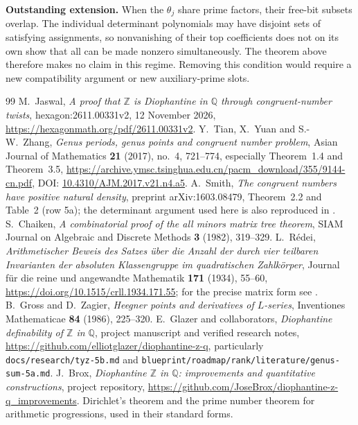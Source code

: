 \documentclass[11pt,a4paper]{article}
\theoremstyle{definition}
\newcommand{\QQ}{\mathbb Q}
\newcommand{\ZZ}{\mathbb Z}
\begin{document}
\textbf{Outstanding extension.}  When the $\theta_j$
share prime factors, their free-bit subsets overlap.
The individual determinant polynomials may have disjoint
sets of satisfying assignments, so nonvanishing of their
top coefficients does not on its own show that all can
be made nonzero simultaneously.  The theorem above
therefore makes no claim in this regime.  Removing this
condition would require a new compatibility argument or
new auxiliary-prime slots.

\begin{thebibliography}{99}
M.~Jaswal, \emph{A proof that $\ZZ$ is Diophantine in $\QQ$
through congruent-number twists}, hexagon:2611.00331v2,
12 November 2026,
\url{https://hexagonmath.org/pdf/2611.00331v2}.
Y.~Tian, X.~Yuan and S.-W.~Zhang,
\emph{Genus periods, genus points and congruent number problem},
Asian Journal of Mathematics \textbf{21} (2017), no.~4,
721--774, especially Theorem~1.4 and Theorem~3.5,
\url{https://archive.ymsc.tsinghua.edu.cn/pacm_download/355/9144-cn.pdf},
DOI: \href{https://doi.org/10.4310/AJM.2017.v21.n4.a5}{10.4310/AJM.2017.v21.n4.a5}.
A.~Smith, \emph{The congruent numbers have positive natural density},
preprint arXiv:1603.08479, Theorem~2.2 and Table~2
(row 5a); the determinant argument used here is also
reproduced in \cite[\S6.2]{Jaswal}.
S.~Chaiken, \emph{A combinatorial proof of the all minors
matrix tree theorem}, SIAM Journal on Algebraic and
Discrete Methods \textbf{3} (1982), 319--329.
L.~R\'edei, \emph{Arithmetischer Beweis des Satzes \"uber die
Anzahl der durch vier teilbaren Invarianten der absoluten Klassengruppe
im quadratischen Zahlk\"orper}, Journal f\"ur die reine und
angewandte Mathematik \textbf{171} (1934), 55--60,
\url{https://doi.org/10.1515/crll.1934.171.55}; for the precise
matrix form see \cite[Proposition~6.7]{Jaswal}.
B.~Gross and D.~Zagier, \emph{Heegner points and derivatives
of $L$-series}, Inventiones Mathematicae \textbf{84}
(1986), 225--320.
E.~Glazer and collaborators,
\emph{Diophantine definability of $\ZZ$ in $\QQ$},
project manuscript and verified research notes,
\url{https://github.com/elliotglazer/diophantine-z-q},
particularly \texttt{docs/research/tyz-5b.md} and
\texttt{blueprint/roadmap/rank/literature/genus-sum-5a.md}.
J.~Brox, \emph{Diophantine $\ZZ$ in $\QQ$: improvements
and quantitative constructions}, project repository,
\url{https://github.com/JoseBrox/diophantine-z-q_improvements}.
Dirichlet's theorem and the prime number theorem for
arithmetic progressions, used in their standard forms.
\end{thebibliography}
\end{document}
